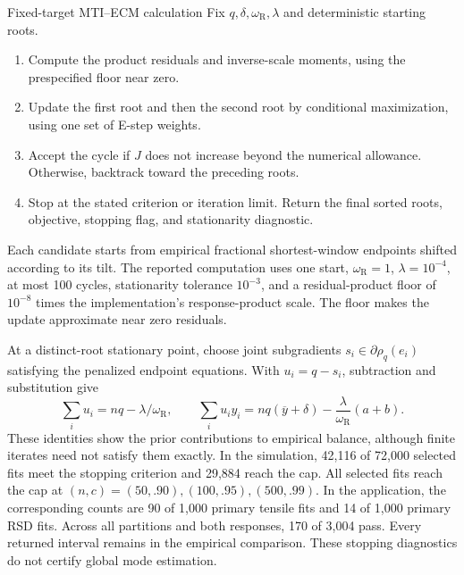 \par\noindent\begin{minipage}{\textwidth}
\begin{algorithmblock}{Fixed-target MTI--ECM calculation}
\label{alg:ch05-mti-ecm}
Fix \(q,\delta,\omega_{\mathrm R},\lambda\) and deterministic starting roots.
\begin{enumerate}
\item Compute the product residuals and inverse-scale moments, using the
prespecified floor near zero.
\item Update the first root and then the second root by conditional
maximization, using one set of E-step weights.
\item Accept the cycle if \(J\) does not increase beyond the numerical
allowance. Otherwise, backtrack toward the preceding roots.
\item Stop at the stated criterion or iteration limit. Return the final
sorted roots, objective, stopping flag, and stationarity diagnostic.
\end{enumerate}
\end{algorithmblock}
\end{minipage}\par

Each candidate starts from empirical fractional shortest-window endpoints
shifted according to its tilt. The reported computation uses one start,
\(\omega_{\mathrm R}=1\), \(\lambda=10^{-4}\), at most 100 cycles,
stationarity tolerance \(10^{-3}\), and a residual-product floor of
\(10^{-8}\) times the implementation's response-product scale. The floor
makes the update approximate near zero residuals.

At a distinct-root stationary point, choose joint subgradients
\(s_i\in\partial\rho_q(e_i)\) satisfying the penalized endpoint equations.
With \(u_i=q-s_i\), subtraction and substitution give
\[
\sum_i u_i=nq-\lambda/\omega_{\mathrm R},\qquad
\sum_i u_i y_i=nq(\overline y+\delta)
-\frac{\lambda}{\omega_{\mathrm R}}(a+b).
\]
These identities show the prior contributions to empirical balance, although finite
iterates need not satisfy them exactly. In the simulation, 42,116 of
72,000 selected fits meet the stopping criterion and 29,884 reach the cap.
All selected fits reach the cap at \((n,c)=(50,.90),(100,.95),(500,.99)\).
In the application, the corresponding counts are 90 of 1,000 primary
tensile fits and 14 of 1,000 primary RSD fits. Across all partitions and
both responses, 170 of 3,004 pass. Every returned interval remains in the
empirical comparison. These stopping diagnostics do not certify global
mode estimation.

